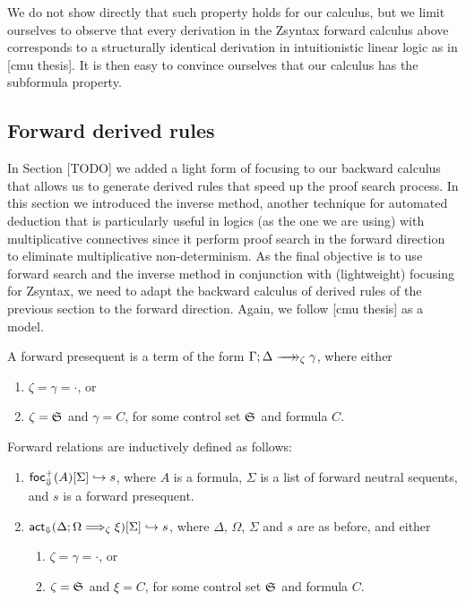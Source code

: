 We do not show directly that such property holds for our calculus, but we limit
ourselves to observe that every derivation in the Zsyntax forward calculus above
corresponds to a structurally identical derivation in intuitionistic linear
logic as in [cmu thesis]. It is then easy to convince ourselves that our
calculus has the subformula property.

\subsection{Forward derived rules}

In Section [TODO] we added a light form of focusing to our backward calculus
that allows us to generate derived rules that speed up the proof search process.
In this section we introduced the inverse method, another technique for
automated deduction that is particularly useful in logics (as the one we are
using) with multiplicative connectives since it perform proof search in the
forward direction to eliminate multiplicative non-determinism. As the final
objective is to use forward search and the inverse method in conjunction with
(lightweight) focusing for Zsyntax, we need to adapt the backward calculus of
derived rules of the previous section to the forward direction. Again, we follow
[cmu thesis] as a model.

\begin{definition}
  A forward presequent is a term of the form
  $\zfneuseq{\Gamma}{\Delta}{\zeta}{\gamma}$, where either

  \begin{enumerate}
  \item $\zeta = \gamma = \cdot$, or
  \item $\zeta = \mathfrak{S}_{}$ and $\gamma = C$, for some control set $\mathfrak{S}_{}$
    and formula $C$.
  \end{enumerate}
\end{definition}

\begin{definition}
  Forward relations are inductively defined as follows:

  \begin{enumerate}
  \item $\textsf{foc}^+_{\Downarrow}(A) [\Sigma] \hookrightarrow s$, where $A$ is a formula, $\Sigma$ is a
    list of forward neutral sequents, and $s$ is a forward presequent.
  \item $\textsf{act}_{\Downarrow}(\Delta ; \Omega \Longrightarrow_{\zeta} \xi)  [\Sigma] \hookrightarrow s$,
    where $\Delta$, $\Omega$, $\Sigma$ and $s$ are as before, and either
    \begin{enumerate}
    \item $\zeta = \gamma = \cdot$, or
    \item $\zeta = \mathfrak{S}_{}$ and $\xi = C$, for some control set $\mathfrak{S}_{}$
      and formula $C$.
    \end{enumerate}
  \end{enumerate}
\end{definition}

